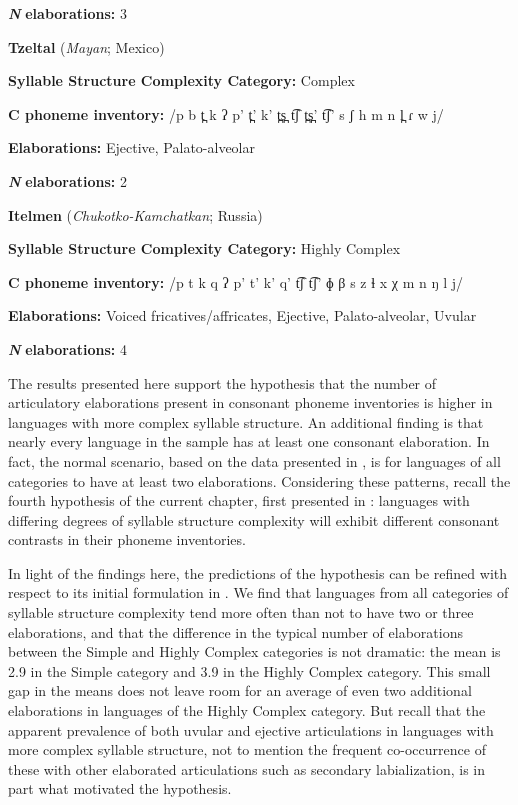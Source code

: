 \textbf{\textit{N}} \textbf{elaborations:} 3
\z

\ea\label{ex:4.30}
  \textbf{Tzeltal} (\textit{Mayan}; Mexico)

\textbf{Syllable Structure Complexity Category:} Complex

\textbf{C phoneme inventory:} /p b t̪ k ʔ p’ t̪’ k’ t̪s̪ t͡ʃ t̪s̪’ t͡ʃ’ s ʃ h m n l̪ ɾ w j/ 

\textbf{Elaborations:} Ejective, Palato-alveolar

\textbf{\textit{N}} \textbf{elaborations:} 2
\z

\ea\label{ex:4.31}
  \textbf{Itelmen} (\textit{Chukotko-Kamchatkan}; Russia)

\textbf{Syllable Structure Complexity Category:} Highly Complex

\textbf{C phoneme inventory:} /p t k q ʔ p’ t’ k’ q’ t͡ʃ t͡ʃ’ ɸ β s z ɬ x χ m n ŋ l j/

\textbf{Elaborations:} Voiced fricatives/affricates, Ejective, Palato-alveolar, Uvular 

\textbf{\textit{N}} \textbf{elaborations:} 4
\z

  The results presented here support the hypothesis that the number of articulatory elaborations present in consonant phoneme inventories is higher in languages with more complex syllable structure. An additional finding is that nearly every language in the sample has at least one consonant elaboration. In fact, the normal scenario, based on the data presented in , is for languages of all categories to have at least two elaborations. Considering these patterns, recall the fourth hypothesis of the current chapter, first presented in : languages with differing degrees of syllable structure complexity will exhibit different consonant contrasts in their phoneme inventories.

  In light of the findings here, the predictions of the hypothesis can be refined with respect to its initial formulation in . We find that languages from all categories of syllable structure complexity tend more often than not to have two or three elaborations, and that the difference in the typical number of elaborations between the Simple and Highly Complex categories is not dramatic: the mean is 2.9 in the Simple category and 3.9 in the Highly Complex category. This small gap in the means does not leave room for an average of even two additional elaborations in languages of the Highly Complex category. But recall that the apparent prevalence of both uvular and ejective articulations in languages with more complex syllable structure, not to mention the frequent co-occurrence of these with other elaborated articulations such as secondary labialization, is in part what motivated the hypothesis.


